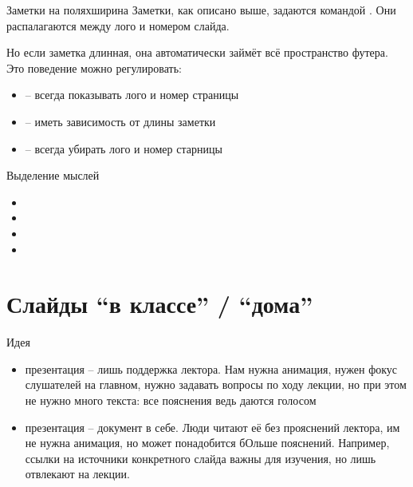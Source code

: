 \documentclass[12pt, aspectratio=43]{beamer}
\begin{document}
    \begin{frame}{Заметки на полях}{ширина}\relax
        Заметки, как описано выше, задаются командой \texttt{\string\cscfootnote}. Они распалагаются между лого и номером слайда.
        
        Но если заметка длинная, она автоматически займёт всё пространство футера. Это поведение можно регулировать:
        \begin{itemize}
            \item \texttt{\string{}} -- всегда показывать лого и номер страницы
            \item \texttt{\string{}} -- иметь зависимость от длины заметки
            \item \texttt{\string{}} -- всегда убирать лого и номер старницы
             
        \end{itemize}
    \end{frame}
    
    \begin{frame}{Выделение мыслей}\relax
         \begin{itemize}
            \item {}
            \item {}
            \item {}
            \item {}
         \end{itemize}
    \end{frame}
    
    \section{Слайды ``в классе'' / ``дома''}
    
    \begin{frame}{Идея}\relax
        \begin{itemize}
            \item {} презентация -- лишь поддержка лектора. Нам нужна анимация, нужен фокус слушателей на главном, нужно задавать вопросы по ходу лекции, но при этом не нужно много текста: все пояснения ведь даются голосом
            \item {} презентация -- документ в себе. Люди читают её без прояснений лектора, им не нужна анимация, но может понадобится бОльше пояснений. Например, ссылки на источники конкретного слайда важны для изучения, но лишь отвлекают на лекции.
             
        \end{itemize}
    \end{frame}
        
\end{document}
